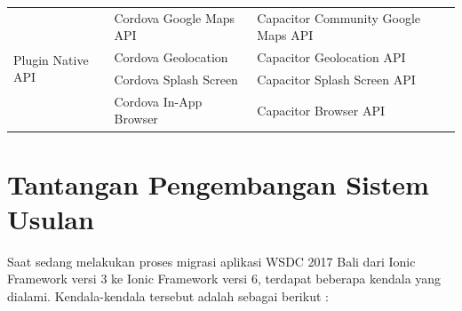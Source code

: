 \begin{table}[H]
\begin{tabular}{|l|ll|}
\multirow{4}{*}{Plugin Native API}                     & \multicolumn{1}{l|}{Cordova Google Maps API}                     & Capacitor Community Google Maps API                                       \\ \cline{2-3} 
                                                       & \multicolumn{1}{l|}{Cordova Geolocation}                         & Capacitor Geolocation API                                                 \\ \cline{2-3} 
                                                       & \multicolumn{1}{l|}{Cordova Splash Screen}                       & Capacitor Splash Screen API                                               \\ \cline{2-3} 
                                                       & \multicolumn{1}{l|}{Cordova In-App Browser}                      & Capacitor Browser API                                                     \\ \hline
\end{tabular}
\label{table:perubahan}
\end{table}

\section{Tantangan Pengembangan Sistem Usulan}
\label{sec:analisisPermasalahanSistemKini}
Saat sedang melakukan proses migrasi aplikasi WSDC 2017 Bali dari Ionic Framework versi 3 ke Ionic Framework versi 6, terdapat beberapa kendala yang dialami. Kendala-kendala tersebut adalah sebagai berikut : 

